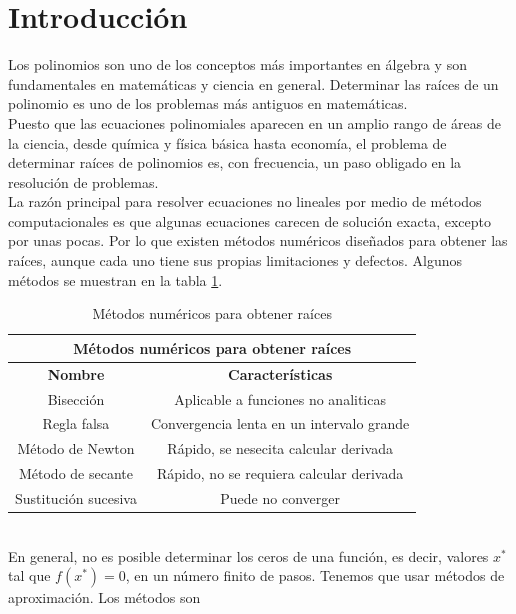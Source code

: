 \documentclass[12pt]{article}
\begin{document}
		\section*{\centering Introducción}\label{sec:Introducción}
			Los polinomios son uno de los conceptos más importantes en álgebra y son fundamentales en 
			matemáticas y ciencia en general. Determinar las raíces de un polinomio es uno de los problemas 
			más antiguos en matemáticas.\\
			Puesto que las ecuaciones polinomiales aparecen en un amplio rango de áreas de la ciencia, desde 
			química y física básica hasta economía, el problema de determinar raíces de polinomios es, con 
			frecuencia, un paso obligado en la resolución de problemas.\cite{bib:item1}\\
			La razón principal para resolver ecuaciones no lineales por medio de métodos computacionales es 
			que algunas ecuaciones carecen de solución exacta, excepto por unas pocas. Por lo que existen 
			métodos numéricos diseñados para obtener las raíces, aunque cada uno tiene sus propias 
			limitaciones y defectos. Algunos métodos se muestran en la tabla \ref{tab:1}.\cite{bib:item2}\\
			\begin{table}[h!]
				\centering
				\begin{tabular}{|c|c|}
					\hline
					\multicolumn{2}{|c|}{\textbf{Métodos numéricos para obtener raíces}}\\
					\hline
					\textbf{Nombre} & \textbf{Características} \\\hline
					Bisección & Aplicable a funciones no analiticas \\\hline
					Regla falsa & Convergencia lenta en un intervalo grande \\\hline								
					Método de Newton & Rápido, se nesecita calcular derivada \\\hline
					Método de secante & Rápido, no se requiera calcular derivada \\\hline
					Sustitución sucesiva & Puede no converger \\\hline
				\end{tabular}
				\caption{Métodos numéricos para obtener raíces \cite{bib:item2}}
				\label{tab:1}
			\end{table}\\
			En general, no es posible determinar los ceros de una función, es decir, valores $ x^* $ tal que $f(x^*) = 0 $, 
			en un número finito de pasos. Tenemos que usar métodos de aproximación. Los métodos son 
\end{document}
